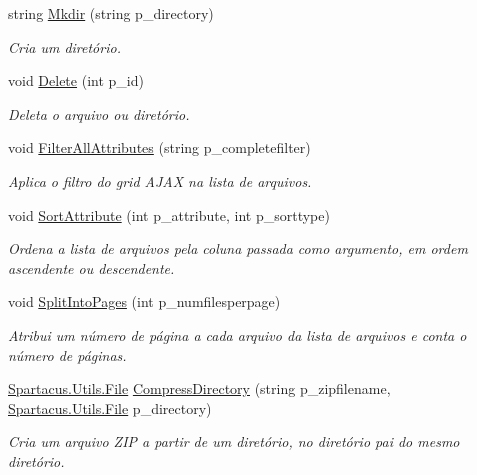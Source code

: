 \begin{DoxyCompactItemize}
string \hyperlink{classSpartacus_1_1Utils_1_1FileExplorer_a40dcbbe8a4d5def3f833e528466047b7}{Mkdir} (string p\+\_\+directory)
\begin{DoxyCompactList}\small\item\em Cria um diretório. \end{DoxyCompactList}\item 
void \hyperlink{classSpartacus_1_1Utils_1_1FileExplorer_ac36b8cdbb3a886587a8891d61fa8ed90}{Delete} (int p\+\_\+id)
\begin{DoxyCompactList}\small\item\em Deleta o arquivo ou diretório. \end{DoxyCompactList}\item 
void \hyperlink{classSpartacus_1_1Utils_1_1FileExplorer_a9f4f49e456a17be5e4051a79539b7459}{Filter\+All\+Attributes} (string p\+\_\+completefilter)
\begin{DoxyCompactList}\small\item\em Aplica o filtro do grid A\+J\+A\+X na lista de arquivos. \end{DoxyCompactList}\item 
void \hyperlink{classSpartacus_1_1Utils_1_1FileExplorer_a9d7be5225c56d655c107c0102c86ef12}{Sort\+Attribute} (int p\+\_\+attribute, int p\+\_\+sorttype)
\begin{DoxyCompactList}\small\item\em Ordena a lista de arquivos pela coluna passada como argumento, em ordem ascendente ou descendente. \end{DoxyCompactList}\item 
void \hyperlink{classSpartacus_1_1Utils_1_1FileExplorer_ad56f638a1f11734ca1157f1cdd39c7e7}{Split\+Into\+Pages} (int p\+\_\+numfilesperpage)
\begin{DoxyCompactList}\small\item\em Atribui um número de página a cada arquivo da lista de arquivos e conta o número de páginas. \end{DoxyCompactList}\item 
\hyperlink{classSpartacus_1_1Utils_1_1File}{Spartacus.\+Utils.\+File} \hyperlink{classSpartacus_1_1Utils_1_1FileExplorer_a698a5f476667204c0fbfad527371dca6}{Compress\+Directory} (string p\+\_\+zipfilename, \hyperlink{classSpartacus_1_1Utils_1_1File}{Spartacus.\+Utils.\+File} p\+\_\+directory)
\begin{DoxyCompactList}\small\item\em Cria um arquivo Z\+I\+P a partir de um diretório, no diretório pai do mesmo diretório. \end{DoxyCompactList}\end{DoxyCompactItemize}
